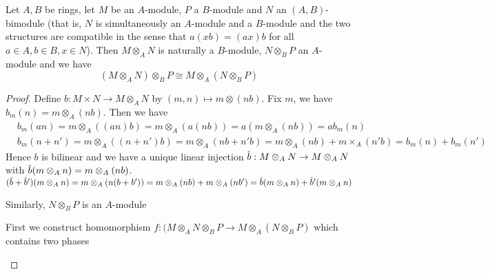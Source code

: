 \documentclass[11pt]{article}
\begin{document}
\begin{exercise}
Let \(A,B\) be rings, let \(M\) be an \(A\)-module, \(P\) a \(B\)-module and \(N\)
an \((A,B)\)-bimodule (that is, \(N\) is simultaneously an \(A\)-module and a \(B\)-module and
the two structures are compatible in the sense that \(a(xb)=(ax)b\) for all \(a\in A,b\in B,x\in N\)).
Then \(M\otimes_AN\) is naturally a \(B\)-module, \(N\otimes_BP\) an \(A\)-module and we have
\begin{equation*}
(M\otimes_AN)\otimes_BP\cong M\otimes_A(N\otimes_BP)
\end{equation*}
\end{exercise}

\begin{proof}
Define \(b:M\times N\to M\otimes_AN\) by \((m,n)\mapsto m\otimes(nb)\). Fix \(m\), we
have \(b_m(n)=m\otimes_A(nb)\). Then we have
\begin{align*}
&b_m(an)=m\otimes_A((an)b)=m\otimes_A(a(nb))=a(m\otimes_A(nb))=ab_m(n)\\
&b_m(n+n')=m\otimes_A((n+n')b)=m\otimes_A(nb+n'b)=m\otimes_A(nb)+m\times_A(n'b)=b_m(n)+b_m(n')
\end{align*}
Hence \(b\) is bilinear and we have a unique linear injection \(\barb:M\otimes_AN\to M\otimes_AN\)
with
\(\barb(m\otimes_An)=m\otimes_A(nb)\).
\((\barb+\barb')(m\otimes_A n)=m\otimes_A(n(b+b'))=m\otimes_A(nb)+m\otimes_A(nb')=\barb(m\otimes_An)+\barb'(m\otimes_An)\)

Similarly, \(N\otimes_BP\) is an \(A\)-module

First we construct homomorphism \(f:(M\otimes_AN\otimes_BP\to M\otimes_A(N\otimes_BP)\) which contains two phases
\begin{center}\quad{}
\end{center}


\end{proof}
\end{document}
